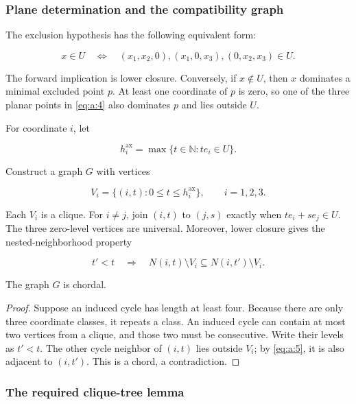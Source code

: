 \subsubsection{Plane determination and the compatibility graph}

The exclusion hypothesis has the following equivalent form:

\begin{equation}
x\in U
\quad\Longleftrightarrow\quad
(x_1,x_2,0),(x_1,0,x_3),(0,x_2,x_3)\in U.
\label{eq:a:4}
\end{equation}

The forward implication is lower closure. Conversely, if \(x\notin U\),
then \(x\) dominates a minimal excluded point \(p\). At least one coordinate
of \(p\) is zero, so one of the three planar points in \eqref{eq:a:4} also dominates
\(p\) and lies outside \(U\).

For coordinate \(i\), let

\[
h_i^{\mathrm{ax}}=\max\{t\in\mathbb N:te_i\in U\}.
\]

Construct a graph \(G\) with vertices

\[
V_i=\{(i,t):0\le t\le h_i^{\mathrm{ax}}\},
\qquad i=1,2,3.
\]

Each \(V_i\) is a clique. For \(i\ne j\), join \((i,t)\) to \((j,s)\)
exactly when \(te_i+se_j\in U\). The three zero-level vertices are
universal. Moreover, lower closure gives the nested-neighborhood property

\begin{equation}
t'<t\quad\Longrightarrow\quad
N(i,t)\setminus V_i\subseteq N(i,t')\setminus V_i.
\label{eq:a:5}
\end{equation}

\begin{lemma}\label{lemma:a:2.1}

The graph \(G\) is chordal.

\end{lemma}
\begin{proof}

Suppose an induced cycle has length at least four. Because there are only
three coordinate classes, it repeats a class. An induced cycle can contain at
most two vertices from a clique, and those two must be consecutive. Write
their levels as \(t'<t\). The other cycle neighbor of
\((i,t)\) lies outside \(V_i\); by \eqref{eq:a:5}, it is also adjacent to \((i,t')\).
This is a chord, a contradiction.
\end{proof}

\subsubsection{The required clique-tree lemma}

